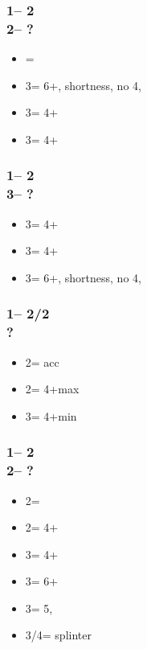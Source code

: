 \documentclass[12pt, a4paper]{report}
\begin{document}
{    \subsubsection*{1\nt -- 2\clubs\\
                    2\nt -- ?}
    \begin{itemize}
        \item \pass = \inv\ \bal
        \item 3\clubs = 6+\diams, \clubs shortness, no 4\major, \gf
        \item 3\diams = 4+\hearts
        \item 3\hearts = 4+\spades
    \end{itemize}

    \subsubsection*{1\nt -- 2\clubs\\
                    3\clubs -- ?}
    \begin{itemize}
        \item 3\diams = 4+\hearts
        \item 3\hearts = 4+\spades
        \item 3\spades = 6+\diams, \clubs shortness, no 4\major, \gf
    \end{itemize}

    \subsubsection*{1\nt -- 2\diams/2\hearts\\
                    ?}
    \begin{itemize}
        \item 2\major = acc
        \item 2\nt = 4+\major max
        \item 3\major = 4+\major min
    \end{itemize}

    \subsubsection*{1\nt -- 2\diams\\
                    2\hearts -- ?}
    \begin{itemize}
        \item 2\spades = \inv
        \item 2\nt = 4+\clubs\ \gf
        \item 3\clubs = 4+\diams\ \gf
        \item 3\diams = 6+\hearts\ \gf
        \item 3\hearts = 5\spades, \inv
        \item 3\spades/4\minor = splinter
    \end{itemize}

}
\end{document}
